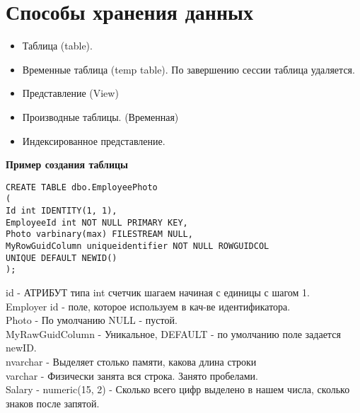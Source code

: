 \section{Способы хранения данных}

\begin{itemize}
	\item Таблица (table).
	\item Временные таблица (temp table). По завершению сессии таблица удаляется.
	\item Представление (View)
	\item Производные таблицы. (Временная)
	\item Индексированное представление.
\end{itemize}

\textbf{Пример создания таблицы}

\lstset{language=SQL}
\begin{lstlisting}
CREATE TABLE dbo.EmployeePhoto
(
Id int IDENTITY(1, 1),
EmployeeId int NOT NULL PRIMARY KEY,
Photo varbinary(max) FILESTREAM NULL,
MyRowGuidColumn uniqueidentifier NOT NULL ROWGUIDCOL
UNIQUE DEFAULT NEWID()
);
\end{lstlisting}

% 

id - АТРИБУТ типа int счетчик шагаем начиная с единицы с шагом 1.\\
Employer id - поле, которое используем в кач-ве идентификатора.\\
Photo - По умолчанию NULL - пустой.\\
MyRawGuidColumn - Уникальное, DEFAULT - по умолчанию поле задается newID.\\
nvarchar -  Выделяет столько памяти, какова длина строки\\
varchar - Физически занята вся строка. Занято пробелами.\\
Salary - numeric(15, 2) - Сколько всего цифр выделено в нашем числа, сколько знаков
после запятой.\\







